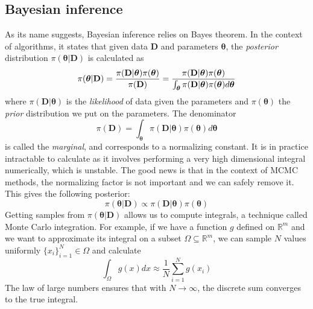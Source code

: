 \documentclass[12pt]{memoir}
\newcommand{\mb}{\mathbf}
\newcommand{\tb}{\textbf}
\newcommand{\ti}{\textit}
\newcommand{\btheta}{\boldsymbol{\theta}}
\begin{document}
\subsection{Bayesian inference}\label{section:background:mcmc:bayesian-inference}
As its name suggests, Bayesian inference relies on Bayes theorem. In the context of algorithms, it states that given data $\mb{D}$ and parameters $\boldsymbol{\theta}$, the \textit{posterior} distribution $\pi(\btheta|\mb{D})$ is calculated as 
\begin{equation} \label{eq:posterior-with-marginal}
    \pi(\boldsymbol{\theta}|\mb{D}) = \frac{\pi(\mb{D}|\boldsymbol{\theta})\pi(\boldsymbol{\theta})}{\pi(\tb D)} = \frac{\pi(\mb{D}|\boldsymbol{\theta})\pi(\boldsymbol{\theta})}{\int_{\boldsymbol{\theta}} \pi(\mb{D}|\boldsymbol{\theta}) \pi(\boldsymbol{\theta})d\boldsymbol{\theta}}
\end{equation}
where $\pi(\mb{D}|\btheta)$ is the \ti{likelihood} of data given the parameters and $\pi(\btheta)$ the \ti{prior} distribution we put on the parameters. The denominator
\begin{equation}
    \pi(\mb{D}) = {\int_{\boldsymbol{\theta}} \pi(\mb{D}|\boldsymbol{\theta}) \pi(\boldsymbol{\theta})d\boldsymbol{\theta}}
\end{equation} 
is called the \ti{marginal}, and corresponds to a normalizing constant. It is in practice intractable to calculate as it involves performing a very high dimensional integral numerically, which is unstable. The good news is that in the context of MCMC methods, the normalizing factor is not important and we can safely remove it. This gives the following posterior:
\begin{equation} \label{eq:posterior-without-marginal}
    \pi(\boldsymbol{\theta}|\mb{D}) \propto {\pi(\mb{D}|\boldsymbol{\theta}) \pi(\boldsymbol{\theta})}
\end{equation}
Getting samples from $\pi(\boldsymbol{\theta}|\mb{D})$ allows us to compute integrals, a technique called Monte Carlo integration. For example, if we have a function $g$ defined on $\mathbb{R}^m$ and we want to approximate its integral on a subset $\Omega \subseteq \mathbb R^m$, we can sample $N$ values uniformly $\{x_i\}_{i=1}^N \in \Omega$ and calculate 
\begin{equation}
    \int_\Omega g(x) dx \approx \frac{1}{N} \sum_{i=1}^{N} g(x_i)
\end{equation}
The law of large numbers ensures that with $N \rightarrow \infty$, the discrete sum converges to the true integral.\cite{wiki:monte-carlo-integration}\medbreak
\end{document}

